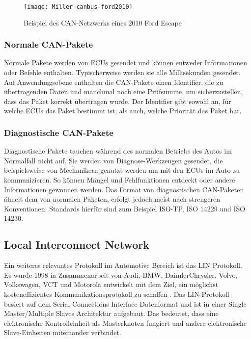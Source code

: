 \begin{figure}[h]
\centering
\texttt{[image: Miller\_canbus-ford2010]}
\label{fig:canbus-ford2010}
\caption{Beispiel des \acs{CAN}-Netzwerks eines 2010 Ford Escape}
\end{figure}

\subsubsection{Normale \acs{CAN}-Pakete}
Normale Pakete werden von \acsp{ECU} gesendet und können entweder Informationen oder Befehle enthalten. Typischerweise werden sie alle Millisekunden gesendet. Auf Anwendungsebene enthalten die \acs{CAN}-Pakete einen Identifier, die zu übertragenden Daten und manchmal noch eine Prüfsumme, um sicherzustellen, dass das Paket korrekt übertragen wurde. Der Identifier gibt sowohl an, für welche \acsp{ECU} das Paket bestimmt ist, als auch, welche Priorität das Paket hat. \cite[vgl.][9]{Miller.2013}

\subsubsection{Diagnostische \acs{CAN}-Pakete}
Diagnostische Pakete tauchen während des normalen Betriebs des Autos im Normalfall nicht auf. Sie werden von Diagnose-Werkzeugen gesendet, die beispielsweise von Mechanikern genutzt werden um mit den \acsp{ECU} im Auto zu kommunizieren. So können Mängel und Fehlfunktionen entdeckt oder andere Informationen gewonnen werden. Das Format von diagnostischen \acs{CAN}-Paketen ähnelt dem von normalen Paketen, erfolgt jedoch meist nach strengeren Konventionen. Standards hierfür sind zum Beispiel ISO-TP, ISO 14229 und ISO 14230. \cite[vgl.][10]{Miller.2013}

\subsection{Local Interconnect Network}
Ein weiteres relevantes Protokoll im Automotive Bereich ist das \ac{LIN} Protokoll. Es wurde 1998 in Zusammenarbeit von Audi, BMW, DaimlerChrysler, Volvo, Volkswagen, VCT und Motorola entwickelt mit dem Ziel, ein möglichst kosteneffizientes Kommunikationsprotokoll zu schaffen \cite[57]{Fijalkowski.2011}.
Das \acs{LIN}-Protokoll basiert auf dem Serial Connections Interface Datenformat und ist in einer Single Master/Multiple Slaves Architektur aufgebaut. Das bedeutet, dass eine elektronische Kontrolleinheit als Masterknoten fungiert und andere elektronische Slave-Einheiten miteinander verbindet.

